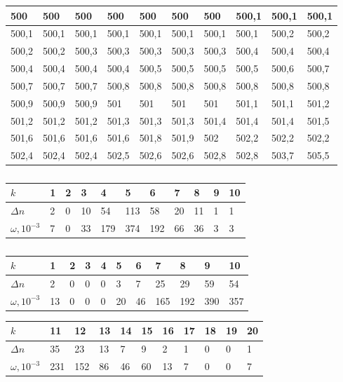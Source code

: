 \documentclass[a4paper, 12pt]{article}
\begin{document}
\begin{table}[!ht]
\begin{tabular}{|l|l|l|l|l|l|l|l|l|l|}
        500 & 500 & 500 & 500 & 500 & 500 & 500 & 500,1 & 500,1 & 500,1 \\ \hline
        500,1 & 500,1 & 500,1 & 500,1 & 500,1 & 500,1 & 500,1 & 500,1 & 500,2 & 500,2 \\ \hline
        500,2 & 500,2 & 500,3 & 500,3 & 500,3 & 500,3 & 500,3 & 500,4 & 500,4 & 500,4 \\ \hline
        500,4 & 500,4 & 500,4 & 500,4 & 500,5 & 500,5 & 500,5 & 500,5 & 500,6 & 500,7 \\ \hline
        500,7 & 500,7 & 500,7 & 500,8 & 500,8 & 500,8 & 500,8 & 500,8 & 500,8 & 500,8 \\ \hline
        500,9 & 500,9 & 500,9 & 501 & 501 & 501 & 501 & 501,1 & 501,1 & 501,2 \\ \hline
        501,2 & 501,2 & 501,2 & 501,3 & 501,3 & 501,3 & 501,4 & 501,4 & 501,4 & 501,5 \\ \hline
        501,6 & 501,6 & 501,6 & 501,6 & 501,8 & 501,9 & 502 & 502,2 & 502,2 & 502,2 \\ \hline
        502,4 & 502,4 & 502,4 & 502,5 & 502,6 & 502,6 & 502,8 & 502,8 & 503,7 & 505,5 \\ \hline
    \end{tabular}
\end{table}

\begin{table}[!ht]
    \caption{}
    \centering
    \begin{tabular}{|l|l|l|l|l|l|l|l|l|l|l|}
    \hline
        $k$ & 1 & 2 & 3 & 4 & 5 & 6 & 7 & 8 & 9 & 10 \\ \hline
        $\Delta n$ & 2 & 0 & 10 & 54 & 113 & 58 & 20 & 11 & 1 & 1 \\ \hline
        $\omega, 10^{-3}$ & 7 & 0 & 33 & 179 & 374 & 192 & 66 & 36 & 3 & 3 \\ \hline
    \end{tabular}
\end{table}

\begin{table}[!ht]
    \caption{}
    \centering
    \begin{tabular}{|l|l|l|l|l|l|l|l|l|l|l|}
    \hline
        $k$ & 1 & 2 & 3 & 4 & 5 & 6 & 7 & 8 & 9 & 10 \\ \hline
        $\Delta n$ & 2 & 0 & 0 & 0 & 3 & 7 & 25 & 29 & 59 & 54 \\ \hline
        $\omega, 10^{-3}$ & 13 & 0 & 0 & 0 & 20 & 46 & 165 & 192 & 390 & 357 \\ \hline
    \end{tabular}
\end{table}
\begin{table}[!ht]
    \centering
    \begin{tabular}{|l|l|l|l|l|l|l|l|l|l|l|}
    \hline
        $k$ & 11 & 12 & 13 & 14 & 15 & 16 & 17 & 18 & 19 & 20 \\ \hline
        $\Delta n$ & 35 & 23 & 13 & 7 & 9 & 2 & 1 & 0 & 0 & 1 \\ \hline
        $\omega, 10^{-3}$ & 231 & 152 & 86 & 46 & 60 & 13 & 7 & 0 & 0 & 7 \\ \hline
    \end{tabular}
\end{table} 
\end{document}
